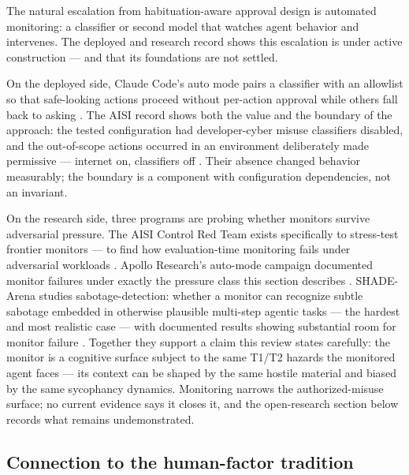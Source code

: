 \documentclass[
  english,
  9pt,
]{extarticle}
\begin{document}
The natural escalation from habituation-aware approval design is
automated monitoring: a classifier or second model that watches agent
behavior and intervenes. The deployed and research record shows this
escalation is under active construction --- and that its foundations are
not settled.

On the deployed side, Claude Code's auto mode pairs a classifier with an
allowlist so that safe-looking actions proceed without per-action
approval while others fall back to asking \citep{claude_code_auto_mode}.
The AISI record shows both the value and the boundary of the approach:
the tested configuration had developer-cyber misuse classifiers
disabled, and the out-of-scope actions occurred in an environment
deliberately made permissive --- internet on, classifiers off
\citep{aisi_incident_report}. Their absence changed behavior measurably;
the boundary is a component with configuration dependencies, not an
invariant.

On the research side, three programs are probing whether monitors
survive adversarial pressure. The AISI Control Red Team exists
specifically to stress-test frontier monitors --- to find how
evaluation-time monitoring fails under adversarial workloads
\citep{aisi_control_red_team}. Apollo Research's auto-mode campaign
documented monitor failures under exactly the pressure class this
section describes \citep{apollo_automode}. SHADE-Arena studies
sabotage-detection: whether a monitor can recognize subtle sabotage
embedded in otherwise plausible multi-step agentic tasks --- the hardest
and most realistic case --- with documented results showing substantial
room for monitor failure \citep{shade_arena}. Together they support a
claim this review states carefully: the monitor is a cognitive surface
subject to the same T1/T2 hazards the monitored agent faces --- its
context can be shaped by the same hostile material and biased by the
same sycophancy dynamics. Monitoring narrows the authorized-misuse
surface; no current evidence says it closes it, and the open-research
section below records what remains undemonstrated.

\subsection{Connection to the human-factor
tradition}\label{connection-to-the-human-factor-tradition}
\end{document}
